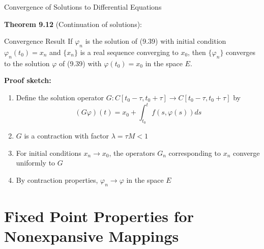 \documentclass[aspectratio=169,10pt]{beamer}
\begin{document}
\begin{frame}[allowframebreaks]{Convergence of Solutions to Differential Equations}

\textbf{Theorem 9.12} (Continuation of solutions):

\begin{block}{Convergence Result}
If $\varphi_n$ is the solution of (9.39) with initial condition $\varphi_n(t_0) = x_n$ and $\{x_n\}$ is a real sequence converging to $x_0$, then $\{\varphi_n\}$ converges to the solution $\varphi$ of (9.39) with $\varphi(t_0) = x_0$ in the space $E$.
\end{block}

\vspace{1.5em}

\textbf{Proof sketch:}
\begin{enumerate}
  \item Define the solution operator $G : C[t_0-\tau, t_0+\tau] \to C[t_0-\tau, t_0+\tau]$ by
  \begin{equation}
    (G\varphi)(t) = x_0 + \int_{t_0}^t f(s, \varphi(s)) ds
  \end{equation}

  \item $G$ is a contraction with factor $\lambda = \tau M < 1$

  \item For initial conditions $x_n \to x_0$, the operators $G_n$ corresponding to $x_n$ converge uniformly to $G$

  \item By contraction properties, $\varphi_n \to \varphi$ in the space $E$
\end{enumerate}

\end{frame}


\section{Fixed Point Properties for Nonexpansive Mappings}
\end{document}
